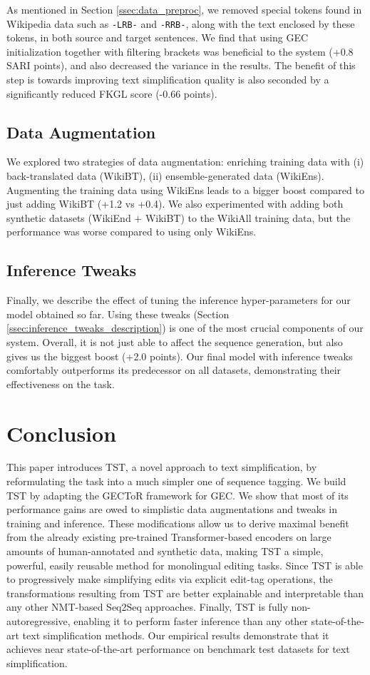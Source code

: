 \documentclass[11pt,a4paper]{article}
\begin{document}
As mentioned in Section \ref{ssec:data_preproc}, we removed special tokens found in Wikipedia data such as \texttt{-LRB-} and \texttt{-RRB-}, along with the text enclosed by these tokens, in both source and target sentences. 
We find that 
using GEC initialization together with filtering brackets was beneficial to the system (+0.8 SARI points), and also decreased the variance in the results. The benefit of this step is towards improving text simplification quality is also seconded by a significantly reduced FKGL score (-0.66 points).

\subsection{Data Augmentation}
We explored two strategies of data augmentation: enriching training data with (i) back-translated data (WikiBT), (ii) ensemble-generated data (WikiEns). Augmenting the training data using WikiEns leads to a bigger boost compared to just adding WikiBT (+1.2 vs +0.4). We also experimented with adding both synthetic datasets (WikiEnd + WikiBT) to the WikiAll training data, but the performance was worse compared to using only WikiEns. 

\subsection{Inference Tweaks}
Finally, we describe the effect of tuning the inference hyper-parameters for our model obtained so far. Using these tweaks (Section \ref{ssec:inference_tweaks_description}) is one of the most crucial components of our system. Overall, it is not just able to affect the sequence generation, but also gives us the biggest boost (+2.0 points). Our final model with inference tweaks comfortably outperforms its predecessor on all datasets, demonstrating their effectiveness on the task.





\section{Conclusion}
This paper introduces TST, a novel approach to text simplification, by reformulating the task into a much simpler one of sequence tagging. We build TST by adapting the GECToR framework for GEC. We show that most of its performance gains are owed to simplistic data augmentations and tweaks in training and inference. These modifications allow us to derive maximal benefit from the already existing pre-trained Transformer-based encoders on large amounts of human-annotated and synthetic data, making TST a simple, powerful, easily reusable method for monolingual editing tasks. Since TST is able to progressively make simplifying edits via explicit edit-tag operations, the transformations resulting from TST are better explainable and interpretable than any other NMT-based Seq2Seq approaches. Finally, TST is fully non-autoregressive, enabling it to perform faster inference than any other state-of-the-art text simplification methods. Our empirical results demonstrate that it achieves near state-of-the-art performance on benchmark test datasets for text simplification.
\end{document}
